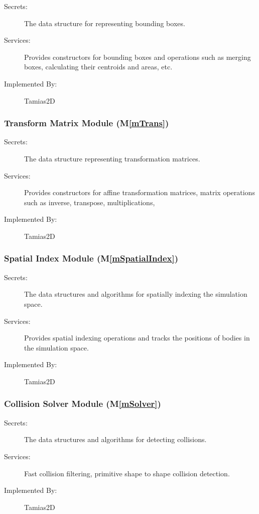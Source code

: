 \documentclass[12pt]{article}
\newcommand{\mref}[1]{M\ref{#1}}
\newcommand{\progname}{Tamias2D}
\begin{document}
\begin{description}
	\item[Secrets:] The data structure for representing bounding boxes.
	\item[Services:] Provides constructors for bounding boxes and operations such as merging boxes, calculating their centroids and areas, etc.
	\item[Implemented By:] \progname
\end{description}

\subsubsection{Transform Matrix Module (\mref{mTrans})}

\begin{description}
	\item[Secrets:] The data structure representing transformation matrices.
	\item[Services:] Provides constructors for affine transformation matrices, matrix operations such as inverse, transpose, multiplications, %
	\item[Implemented By:] \progname
\end{description}

\subsubsection{Spatial Index Module (\mref{mSpatialIndex})}

\begin{description}
	\item[Secrets:] The data structures and algorithms for spatially indexing the simulation space.
	\item[Services:] Provides spatial indexing operations and tracks the positions of bodies in the simulation space.
	\item[Implemented By:] \progname
\end{description}

\subsubsection{Collision Solver Module (\mref{mSolver})}

\begin{description}
	\item[Secrets:] The data structures and algorithms for detecting collisions.
	\item[Services:] Fast collision filtering, primitive shape to shape collision detection.
	\item[Implemented By:] \progname
\end{description}
\end{document}

